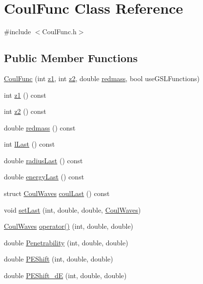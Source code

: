 \hypertarget{classCoulFunc}{\section{Coul\-Func Class Reference}
\label{classCoulFunc}
}


{\ttfamily \#include $<$Coul\-Func.\-h$>$}

\subsection*{Public Member Functions}
\begin{DoxyCompactItemize}
\item 
\hyperlink{classCoulFunc_ae18ce8083cc140cf033fe242c5bc0279}{Coul\-Func} (int \hyperlink{classCoulFunc_a51a653c4ce27453d047b12cd9c259e60}{z1}, int \hyperlink{classCoulFunc_aa6bdb6af4163b9e2394123ad7daadedc}{z2}, double \hyperlink{classCoulFunc_a75d3ef5760151219ef16c916db221a83}{redmass}, bool use\-G\-S\-L\-Functions)
\item 
int \hyperlink{classCoulFunc_a51a653c4ce27453d047b12cd9c259e60}{z1} () const 
\item 
int \hyperlink{classCoulFunc_aa6bdb6af4163b9e2394123ad7daadedc}{z2} () const 
\item 
double \hyperlink{classCoulFunc_a75d3ef5760151219ef16c916db221a83}{redmass} () const 
\item 
int \hyperlink{classCoulFunc_af26580308c3aa3c6ed6d8010272e0cc3}{l\-Last} () const 
\item 
double \hyperlink{classCoulFunc_a294416dd0757533011ebfd56c9597739}{radius\-Last} () const 
\item 
double \hyperlink{classCoulFunc_ae6857b43f747e15e3948592cb68331f9}{energy\-Last} () const 
\item 
struct \hyperlink{structCoulWaves}{Coul\-Waves} \hyperlink{classCoulFunc_ac983b0b5fb84cc2065cca446ad392a7f}{coul\-Last} () const 
\item 
void \hyperlink{classCoulFunc_a42b754e3636f46c728c3fd1d07b38991}{set\-Last} (int, double, double, \hyperlink{structCoulWaves}{Coul\-Waves})
\item 
\hyperlink{structCoulWaves}{Coul\-Waves} \hyperlink{classCoulFunc_ab8e9ec2de76a9d91f127808668bc09c7}{operator()} (int, double, double)
\item 
double \hyperlink{classCoulFunc_ac8b8f683db1e485c996ae74273dfa79e}{Penetrability} (int, double, double)
\item 
double \hyperlink{classCoulFunc_aecd3469fbf1a12ac6269e287c39b9ed3}{P\-E\-Shift} (int, double, double)
\item 
double \hyperlink{classCoulFunc_a25e6977287af90803d47eb70a2433ce0}{P\-E\-Shift\-\_\-d\-E} (int, double, double)
\end{DoxyCompactItemize}
